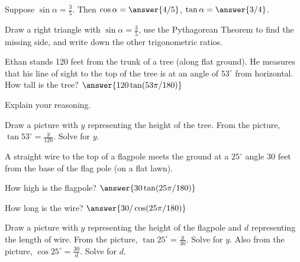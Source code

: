 \documentclass[nooutcomes]{ximera}
\begin{document}
\begin{problem}
Suppose $\sin\alpha = \frac{3}{5}$.  Then $\cos\alpha = \answer{4/5}$, $\tan\alpha = \answer{3/4}$.  
\begin{hint}Draw a right triangle with $\sin\alpha = \frac{3}{5}$, use the Pythagorean Theorem to find the missing side, 
and write down the other trigonometric ratios.\end{hint}
\end{problem}

\begin{problem}
Ethan stands 120 feet from the trunk of a tree (along flat ground). He measures that his line of sight to the top of the tree is at an angle of $53^\circ$ from horizontal. How tall is the tree?  $\answer{120\tan(53\pi/180)}$

Explain your reasoning.
\begin{hint}Draw a picture with $y$ representing the height of the tree.  From the picture, $\tan 53^\circ = \frac{y}{120}$.  Solve for $y$. \end{hint}
\end{problem}

\begin{problem}
A straight wire to the top of a flagpole meets the ground at a $25^\circ$ angle 30 feet from the base of the flag pole (on a flat lawn).  

How high is the flagpole?  $\answer{30\tan(25\pi/180)}$

How long is the wire?  $\answer{30/\cos(25\pi/180)}$
\begin{hint}Draw a picture with $y$ representing the height of the flagpole and $d$ representing the length of wire.  From the picture, $\tan 25^\circ = \frac{y}{30}$.  Solve for $y$.  Also from the picture, $\cos 25^\circ = \frac{30}{d}$.  Solve for $d$. 
\end{hint}
\end{problem}
\end{document}

